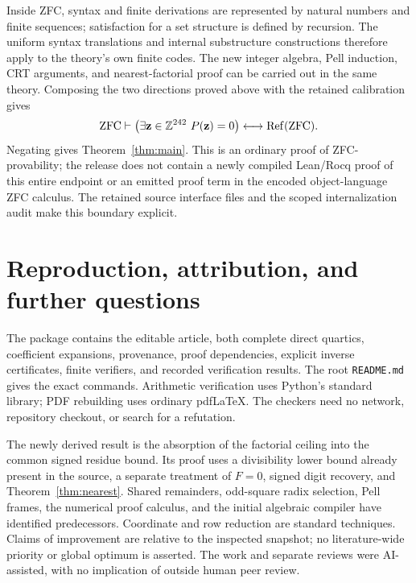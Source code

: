 \documentclass[11pt,letterpaper]{article}
\theoremstyle{remark}\newtheorem{remark}[theorem]{Remark}
\newcommand{\Z}{\mathbb Z}\newcommand{\N}{\mathbb N}
\newcommand{\Refut}{\operatorname{Ref}}\newcommand{\PellX}{\mathsf X}\newcommand{\PellY}{\mathsf Y}
\begin{document}
Inside ZFC, syntax and finite derivations are represented by natural numbers and finite sequences; satisfaction for a set structure is defined by recursion. The uniform syntax translations and internal substructure constructions therefore apply to the theory's own finite codes. The new integer algebra, Pell induction, CRT arguments, and nearest-factorial proof can be carried out in the same theory. Composing the two directions proved above with the retained calibration gives
\[
 \ZFC\vdash
 \bigl(\exists\mathbf z\in\Z^{\MainVariables}\ P(\mathbf z)=0\bigr)
 \longleftrightarrow\Refut(\ZFC).
\]
Negating gives Theorem~\ref{thm:main}. This is an ordinary proof of ZFC-provability; the release does not contain a newly compiled Lean/Rocq proof of this entire endpoint or an emitted proof term in the encoded object-language ZFC calculus. The retained source interface files and the scoped internalization audit make this boundary explicit.

\section{Reproduction, attribution, and further questions}
\label{sec:reproduction}
The package contains the editable article, both complete direct quartics, coefficient expansions, provenance, proof dependencies, explicit inverse certificates, finite verifiers, and recorded verification results. The root \texttt{README.md} gives the exact commands. Arithmetic verification uses Python's standard library; PDF rebuilding uses ordinary pdfLaTeX. The checkers need no network, repository checkout, or search for a refutation.

The newly derived result is the absorption of the factorial ceiling into the common signed residue bound. Its proof uses a divisibility lower bound already present in the source, a separate treatment of $F=0$, signed digit recovery, and Theorem~\ref{thm:nearest}. Shared remainders, odd-square radix selection, Pell frames, the numerical proof calculus, and the initial algebraic compiler have identified predecessors. Coordinate and row reduction are standard techniques. Claims of improvement are relative to the inspected snapshot; no literature-wide priority or global optimum is asserted. The work and separate reviews were AI-assisted, with no implication of outside human peer review.
\end{document}
